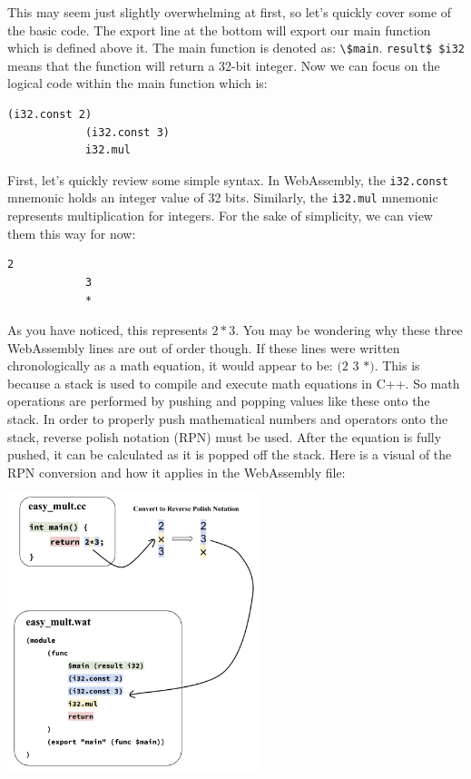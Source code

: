 \documentclass{article}
\theoremstyle{theorem}
\theoremstyle{definition}
\theoremstyle{remark}
\begin{document}
\medskip\noindent
This may seem just slightly overwhelming at first, so let's quickly cover some of the basic code. The export line at the bottom will export our main function which is defined above it. The main function is denoted as: \verb|\$main|. \verb|result$ $i32| means that the function will return a 32-bit integer. Now we can focus on the logical code within the main function which is:

\medskip\noindent
\begin{lstlisting}[style=WasmStyle]
            (i32.const 2)
            (i32.const 3)
            i32.mul
\end{lstlisting}

\medskip\noindent
First, let's quickly review some simple syntax. In WebAssembly, the \verb|i32.const| mnemonic holds an integer value of 32 bits. Similarly, the \verb|i32.mul| mnemonic represents multiplication for integers. For the sake of simplicity, we can view them this way for now:

\medskip\noindent
\begin{lstlisting}[style=CStyle]
            2
            3
            *
\end{lstlisting}

\medskip\noindent
As you have noticed, this represents $2*3$. You may be wondering why these three WebAssembly lines are out of order though. If these lines were written chronologically as a math equation, it would appear to be: $(2$ $3$ $*)$. This is because a stack is used to compile and execute math equations in C++. So math operations are performed by pushing and popping values like these onto the stack. In order to properly push mathematical numbers and operators onto the stack, reverse polish notation (RPN) must be used. After the equation is fully pushed, it can be calculated as it is popped off the stack. Here is a visual of the RPN conversion and how it applies in the WebAssembly file:

\bigskip
\begin{center}
\includegraphics[width=0.55\textwidth]{Images/easy_mult_cc_to_wat.png}
\end{center}
\end{document}
